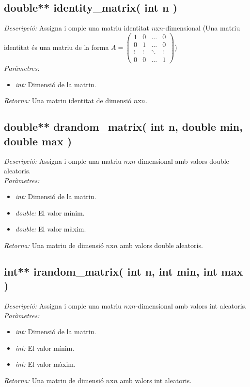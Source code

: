 \documentclass[a4paper,10pt, notitlepage]{article}
\begin{document}
\subsection{double** identity\_matrix( int n )}
\textit{Descripció: }
  Assigna i omple una matriu identitat $n$x$n$-dimensional (Una matriu identitat és una matriu de la forma $A = 
  \begin{pmatrix}
    1 & 0 & \dots & 0 \\
    0 & 1 & \dots & 0 \\
    \vdots & \vdots & \ddots & \vdots \\
    0 & 0 & \dots & 1 
  \end{pmatrix}$)
\\\textit{Paràmetres: }\begin{itemize}[label={--}]
  \item \textit{int: } Dimensió de la matriu.
\end{itemize}
\textit{Retorna: } Una matriu identitat de dimensió $n$x$n$.



\subsection{double** drandom\_matrix( int n, double min, double max )}
\textit{Descripció: }
  Assigna i omple una matriu $n$x$n$-dimensional amb valors double aleatoris.
\\\textit{Paràmetres: }\begin{itemize}[label={--}]
  \item \textit{int: } Dimensió de la matriu.
  \item \textit{double: } El valor mínim.
  \item \textit{double: } El valor màxim.
\end{itemize}
\textit{Retorna: } Una matriu de dimensió $n$x$n$ amb valors double aleatoris.



\subsection{int** irandom\_matrix( int n, int min, int max )}
\textit{Descripció: }
  Assigna i omple una matriu $n$x$n$-dimensional amb valors int aleatoris.
\\\textit{Paràmetres: }\begin{itemize}[label={--}]
  \item \textit{int: } Dimensió de la matriu.
  \item \textit{int: } El valor mínim.
  \item \textit{int: } El valor màxim.
\end{itemize}
\textit{Retorna: } Una matriu de dimensió $n$x$n$ amb valors int aleatoris.
\end{document}

